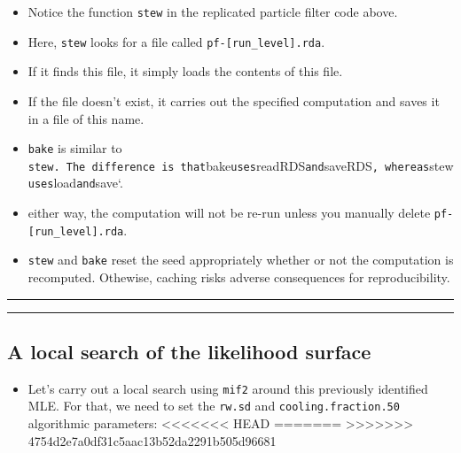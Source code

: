 \documentclass[]{article}
\providecommand{\tightlist}{%
  \setlength{\itemsep}{0pt}\setlength{\parskip}{0pt}}
\begin{document}
\begin{itemize}
\item
  Notice the function \texttt{stew} in the replicated particle filter
  code above.
\item
  Here, \texttt{stew} looks for a file called
  \texttt{pf-{[}run\_level{]}.rda}.
\item
  If it finds this file, it simply loads the contents of this file.
\item
  If the file doesn't exist, it carries out the specified computation
  and saves it in a file of this name.
\item
  \texttt{bake} is similar to
  \texttt{stew.\ The\ difference\ is\ that}bake\texttt{uses}readRDS\texttt{and}saveRDS\texttt{,\ whereas}stew\texttt{uses}load\texttt{and}save`.
\item
  either way, the computation will not be re-run unless you manually
  delete \texttt{pf-{[}run\_level{]}.rda}.
\item
  \texttt{stew} and \texttt{bake} reset the seed appropriately whether
  or not the computation is recomputed. Othewise, caching risks adverse
  consequences for reproducibility.
\end{itemize}

\begin{center}\rule{0.5\linewidth}{\linethickness}\end{center}

\begin{center}\rule{0.5\linewidth}{\linethickness}\end{center}

\subsection{A local search of the likelihood
surface}\label{a-local-search-of-the-likelihood-surface}

\begin{itemize}
\tightlist
\item
  Let's carry out a local search using \texttt{mif2} around this
  previously identified MLE. For that, we need to set the \texttt{rw.sd}
  and \texttt{cooling.fraction.50} algorithmic parameters:
<<<<<<< HEAD
=======
>>>>>>> 4754d2e7a0df31c5aac13b52da2291b505d96681
\end{itemize}
\end{document}
